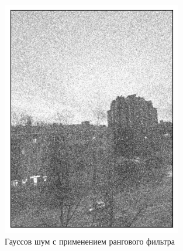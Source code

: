 \documentclass[a4paper,12pt]{article}
\begin{document}
\begin{figure}[H]
    \begin{minipage}{0.49\textwidth}
        \centering \includegraphics[width=\textwidth]{results/nlf_gaus_4.png}
        \caption{Гауссов шум с применением рангового фильтра}
    \end{minipage}\hfill
    \begin{minipage}{0.49\textwidth}

\end{minipage}
\end{figure}
\end{document}
